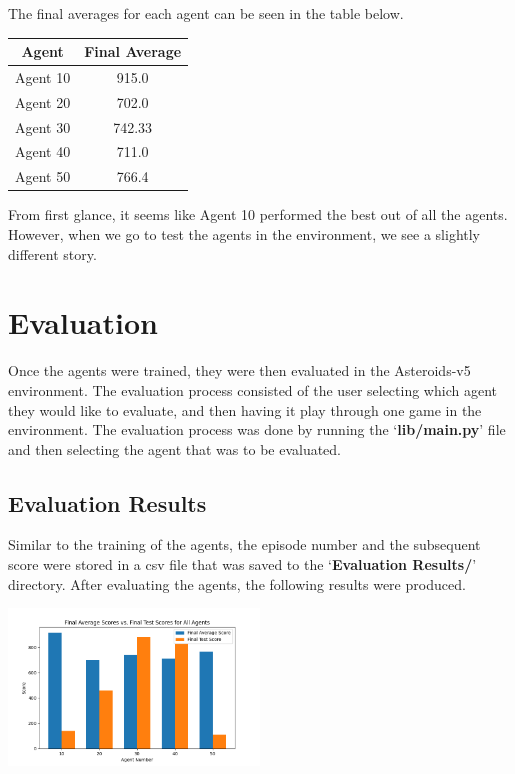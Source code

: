 \documentclass[
	a4paper, %
	10pt, %
	unnumberedsections, %
	twoside, %
]{LTJournalArticle}
\begin{document}
The final averages for each agent can be seen in the table below.

\begin{center}
	\begin{tabular}{|c|c|}
		\hline
		\textbf{Agent} & \textbf{Final Average} \\
		\hline
		Agent 10 & 915.0 \\ \hline
		Agent 20 & 702.0 \\ \hline
		Agent 30 & 742.33 \\ \hline
		Agent 40 & 711.0 \\ \hline
		Agent 50 & 766.4 \\ \hline
	\end{tabular}
\end{center}

From first glance, it seems like Agent 10 performed the best out of all the agents. However, when we go to test the agents in the environment, we see a slightly different story.

\section{Evaluation}

Once the agents were trained, they were then evaluated in the Asteroids-v5 environment. The evaluation process consisted of the user selecting which agent they would like to evaluate, and then having
it play through one game in the environment. The evaluation process was done by running the `\textbf{lib/main.py}' file and then selecting the agent that was to be evaluated.

\subsection{Evaluation Results}

Similar to the training of the agents, the episode number and the subsequent score were stored in a csv file that was saved to the `\textbf{Evaluation Results/}' directory. After evaluating the agents,
the following results were produced.

\begin{center}
	\includegraphics[width=0.5\textwidth]{Figures/All Agent Testing.png}
\end{center}
\end{document}
